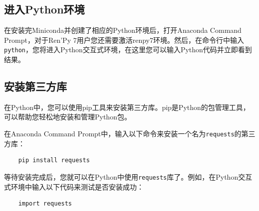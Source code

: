 \documentclass[../../Main.tex]{subfiles}
\begin{document}
\subsection{进入Python环境}
在安装完Miniconda并创建了相应的Python环境后，打开Anaconda Command Prompt，对于Ren'Py 7用户您还需要激活renpy7环境。然后，在命令行中输入\verb|python|，您将进入Python交互式环境，在这里您可以输入Python代码并立即看到结果。

\subsection{安装第三方库}
在Python中，您可以使用pip工具来安装第三方库。pip是Python的包管理工具，可以帮助您轻松地安装和管理Python包。

在Anaconda Command Prompt中，输入以下命令来安装一个名为\verb|requests|的第三方库：
\begin{verbatim}
    pip install requests
\end{verbatim}

等待安装完成后，您就可以在Python中使用\verb|requests|库了。例如，在Python交互式环境中输入以下代码来测试是否安装成功：
\begin{verbatim}
    import requests
\end{verbatim}
\end{document}
